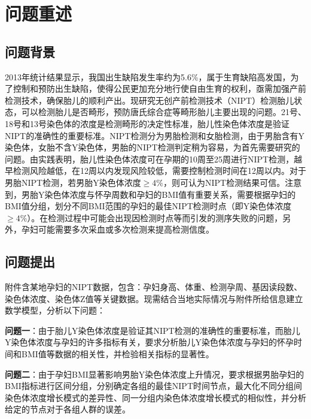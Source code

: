 \documentclass[withoutpreface,bwprint]{cumcmthesis}
\begin{document}

\section{问题重述}
\subsection{问题背景}
\vspace{-5pt}2013年统计结果显示，我国出生缺陷发生率约为5.6\%，属于生育缺陷高发国，为了控制和预防出生缺陷，使得公民更加充分地行使自由生育的权利，亟需加强产前检测技术，确保胎儿的顺利产出。现研究无创产前检测技术（NIPT）检测胎儿状态，可以检测胎儿是否畸形，预防唐氏综合症等畸形胎儿主要出现的问题。21号、18号和13号染色体的浓度是检测畸形的决定性标准，胎儿性染色体浓度是验证NIPT的准确性的重要标准。NIPT检测分为男胎检测和女胎检测，由于男胎含有Y染色体，女胎不含Y染色体，男胎的NIPT检测判定稍为容易，为首先需要研究的问题。由实践表明，胎儿性染色体浓度可在孕期的10周至25周进行NIPT检测，越早检测风险越低，在12周以内发现风险较低，需要控制检测时间在12周以内。对于男胎NIPT检测，若男胎Y染色体浓度$\geq4\%$，则可认为NIPT检测结果可信。注意到，男胎Y染色体浓度与怀孕周数和孕妇的BMI值有重要关系，需要根据孕妇的BMI值分组，划分不同BMI范围的孕妇的最佳NIPT检测时点（即Y染色体浓度$\geq4\%$）。在检测过程中可能会出现因检测时点等而引发的测序失败的问题，另外，孕妇可能需要多次采血或多次检测来提高检测信度。
\vspace{-13pt}\subsection{问题提出}

附件含某地孕妇的NIPT数据，包含：孕妇身高、体重、检测孕周、基因读段数、染色体浓度、染色体Z值等关键数据。现需结合当地实际情况与附件所给信息建立数学模型，分析以下问题：

\textbf{问题一}：由于胎儿Y染色体浓度是验证其NIPT检测的准确性的重要标准，而胎儿Y染色体浓度与孕妇的许多指标有关，要求分析胎儿Y染色体浓度与孕妇的怀孕时间和BMI值等数据的相关性，并检验相关指标的显著性。

\textbf{问题二}：由于孕妇BMI显著影响男胎Y染色体浓度上升情况，要求根据男胎孕妇的BMI指标进行区间分组，分别确定各组的最佳NIPT时间节点，最大化不同分组间染色体浓度增长模式的差异性、同一分组内染色体浓度增长模式的相似性，并分析给定的节点对于各组人群的误差。
\end{document}
